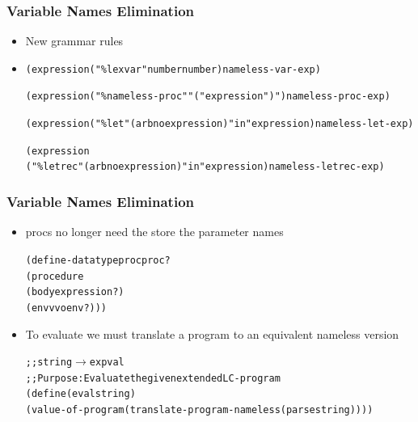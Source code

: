 \documentclass{beamer}
\newcommand{\arrow}{\(\rightarrow\)}
\begin{document}
\begin{frame}[fragile]
\frametitle{Variable Names Elimination}
\begin{scriptsize}
\begin{itemize}
\item<1-> New grammar rules

\item<1->
\begin{alltt}
(expression ("\%lexvar" number number) nameless-var-exp)

(expression ("\%nameless-proc" "(" expression ")") nameless-proc-exp)

(expression ("\%let" (arbno expression) "in" expression) nameless-let-exp)

(expression
  ("\%letrec" (arbno expression) "in" expression) nameless-letrec-exp)
\end{alltt}

\end{itemize}
\end{scriptsize}
\end{frame}

\begin{frame}[fragile]
\frametitle{Variable Names Elimination}
\begin{scriptsize}
\begin{itemize}
\item<1-> procs no longer need the store the parameter names
\begin{alltt}
(define-datatype proc proc?
  (procedure
   (body expression?)
   (envv voenv?)))
\end{alltt}

\item<2-> To evaluate we must translate a program to an equivalent nameless version
\begin{alltt}
;; string \arrow{} expval
;; Purpose: Evaluate the given extended LC-program
(define (eval string)
  (value-of-program (translate-program-nameless (parse string))))
\end{alltt}

\end{itemize}
\end{scriptsize}
\end{frame}
\end{document}
